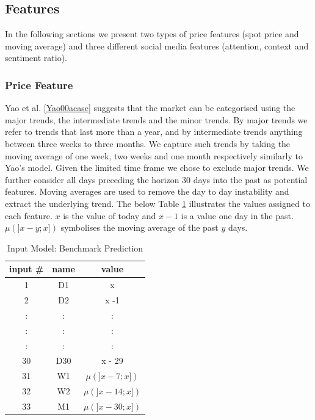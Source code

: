\subsection{Features}

In the following sections we present two types of price features (spot price and moving average) and three different social media features (attention, context and sentiment ratio).

\subsubsection{Price Feature}

Yao et al. \ref{Yao00acase} suggests that the market can be categorised using the major trends, the intermediate trends and the minor trends. By major trends we refer to trends that last more than a year, and by intermediate trends anything between three weeks to three months. We capture such trends by taking the moving average of one week, two weeks and one month respectively similarly to Yao's model. Given the limited time frame we chose to exclude major trends. We further consider all days preceding the horizon 30 days into the past as potential features. Moving averages are used to remove the day to day instability and extract the underlying trend\cite{armstrong01}. The below Table \ref{tab:inputModel} illustrates the values assigned to each feature. $x$ is the value of today and $x-1$ is a value one day in the past. $\mu(]x-y;x])$ symbolises the moving average of the past $y$ days. 


\begin{table}[H]
\centering
\begin{tabular}{ |c|c|c| } 

 input \# & name & value \\ 
  \hline
 1 & D1 & x \\ 
 2 & D2 & x -1 \\ 
 :& : & : \\ 
  :& : & : \\ 
  :& : & : \\ 
  30 & D30 & x - 29\\ 
  31 & W1 & $\mu(]x-7;x])$ \\ 
  32 & W2 & $\mu(]x-14;x])$ \\ 
  33 & M1 & $\mu(]x-30;x])$ \\ 
 

\end{tabular}
\caption{Input Model: Benchmark Prediction}
\label{tab:inputModel}
\end{table}


